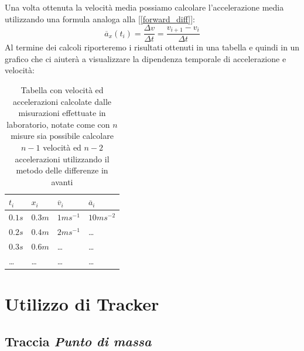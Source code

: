 \documentclass[a4paper,10pt,oneside]{article}
\begin{document}
Una volta ottenuta la velocità media possiamo calcolare l'accelerazione media utilizzando una formula analoga alla [\ref{forward_diff}]:
\begin{equation}
 \overline{a}_x(t_i)=\frac{\Delta v}{\Delta t}=\frac{v_{i+1}-v_i}{\Delta t}
\end{equation}
Al termine dei calcoli riporteremo i risultati ottenuti in una tabella e quindi in un grafico che ci aiuterà a visualizzare la dipendenza temporale di accelerazione  e velocità:
\begin{table}[H]
\begin{center}
\begin{tabular}{llll}\toprule
$t_i$ & $x_i$& $\overline{v}_i$& $\overline{a}_i$ \\ \midrule
$0.1s$&$0.3m$&$1ms^{-1}$&$10ms^{-2}$\\
$0.2s$&$0.4m$&$2ms^{-1}$&\ldots\\
$0.3s$&$0.6m$&\dots&\ldots\\
\ldots &\ldots&\dots&\dots \\ \bottomrule
\end{tabular}\caption{Tabella con velocità ed accelerazioni calcolate dalle misurazioni effettuate in laboratorio, notate come con $n$ misure sia possibile calcolare $n-1$ velocità ed $n-2$  accelerazioni utilizzando il metodo delle differenze in avanti}\label{tab:extab1}
\end{center}
\end{table}



\section*{Utilizzo di Tracker}

\subsection*{Traccia \emph{Punto di massa}}
\end{document}
